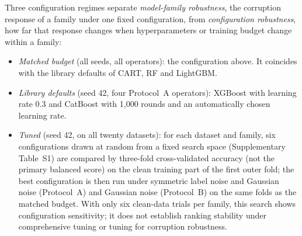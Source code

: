 \documentclass[pdflatex,sn-mathphys]{sn-jnl}
\theoremstyle{thmstyleone}
\theoremstyle{thmstyletwo}
\theoremstyle{thmstylethree}
\begin{document}
Three configuration regimes separate \emph{model-family robustness}, the corruption response of a family under one fixed configuration, from \emph{configuration robustness}, how far that response changes when hyperparameters or training budget change within a family:
\begin{itemize}
\item \emph{Matched budget} (all seeds, all operators): the configuration above. It coincides with the library defaults of CART, RF and LightGBM.
\item \emph{Library defaults} (seed 42, four Protocol~A operators): XGBoost with learning rate $0.3$ and CatBoost with 1,000 rounds and an automatically chosen learning rate.
\item \emph{Tuned} (seed 42, on all twenty datasets): for each dataset and family, six configurations drawn at random from a fixed search space (Supplementary Table~S1) are compared by three-fold cross-validated accuracy (not the primary balanced score) on the clean training part of the first outer fold; the best configuration is then run under symmetric label noise and Gaussian noise (Protocol~A) and Gaussian noise (Protocol~B) on the same folds as the matched budget. With only six clean-data trials per family, this search shows configuration sensitivity; it does not establish ranking stability under comprehensive tuning or tuning for corruption robustness.
\end{itemize}
\end{document}

